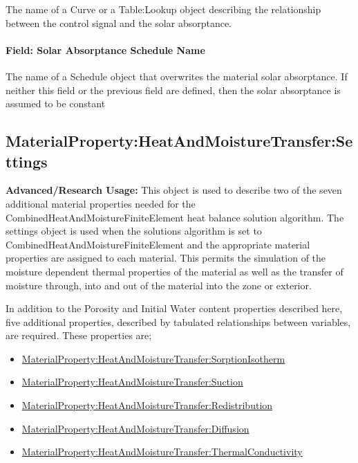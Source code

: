 The name of a Curve or a Table:Lookup object describing the relationship between the control signal and the solar absorptance.

\paragraph{Field: Solar Absorptance Schedule Name}\label{field-solar-absorptance-schedule-name}

The name of a Schedule object that overwrites the material solar absorptance.
If neither this field or the previous field are defined, then the solar absorptance is assumed to be constant

\subsection{MaterialProperty:HeatAndMoistureTransfer:Settings}\label{materialpropertyheatandmoisturetransfersettings}

\textbf{Advanced/Research Usage:} This object is used to describe two of the seven additional material properties needed for the CombinedHeatAndMoistureFiniteElement heat balance solution algorithm. The settings object is used when the solutions algorithm is set to CombinedHeatAndMoistureFiniteElement and the appropriate material properties are assigned to each material. This permits the simulation of the moisture dependent thermal properties of the material as well as the transfer of moisture through, into and out of the material into the zone or exterior.

In addition to the Porosity and Initial Water content properties described here, five additional properties, described by tabulated relationships between variables, are required. These properties are;

\begin{itemize}
\item
  \hyperref[materialpropertyheatandmoisturetransfersorptionisotherm]{MaterialProperty:HeatAndMoistureTransfer:SorptionIsotherm}
\item
  \hyperref[materialpropertyheatandmoisturetransfersuction]{MaterialProperty:HeatAndMoistureTransfer:Suction}
\item
  \hyperref[materialpropertyheatandmoisturetransferredistribution]{MaterialProperty:HeatAndMoistureTransfer:Redistribution}
\item
  \hyperref[materialpropertyheatandmoisturetransferdiffusion]{MaterialProperty:HeatAndMoistureTransfer:Diffusion}
\item
  \hyperref[materialpropertyheatandmoisturetransferthermalconductivity]{MaterialProperty:HeatAndMoistureTransfer:ThermalConductivity}
\end{itemize}


